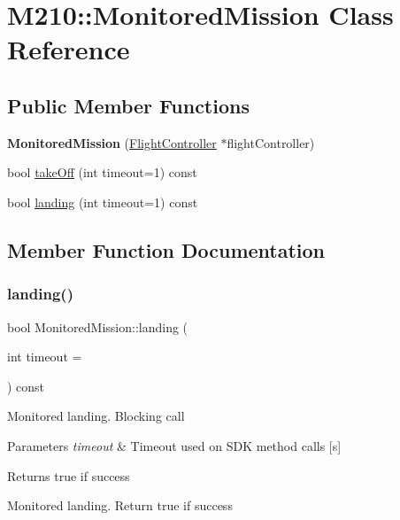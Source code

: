 \hypertarget{class_m210_1_1_monitored_mission}{}\section{M210\+:\+:Monitored\+Mission Class Reference}
\label{class_m210_1_1_monitored_mission}
\subsection*{Public Member Functions}
\begin{DoxyCompactItemize}
\item 
\mbox{\label{class_m210_1_1_monitored_mission_a7f47ae2a0d72c6f28b33c81950b6c215}} 
{\bfseries Monitored\+Mission} (\mbox{\hyperlink{class_m210_1_1_flight_controller}{Flight\+Controller}} $\ast$flight\+Controller)
\item 
bool \mbox{\hyperlink{class_m210_1_1_monitored_mission_a70392abfa221992cf46ffddae110ee5a}{take\+Off}} (int timeout=1) const
\item 
bool \mbox{\hyperlink{class_m210_1_1_monitored_mission_aa9c133ca528a6942514a5be8395b4984}{landing}} (int timeout=1) const
\end{DoxyCompactItemize}


\subsection{Member Function Documentation}
\mbox{\label{class_m210_1_1_monitored_mission_aa9c133ca528a6942514a5be8395b4984}} 
\subsubsection{\texorpdfstring{landing()}{landing()}}
{\footnotesize\ttfamily bool Monitored\+Mission\+::landing (\begin{DoxyParamCaption}\item[{int}]{timeout = {} }\end{DoxyParamCaption}) const}

Monitored landing. Blocking call 
\begin{DoxyParams}{Parameters}
{\em timeout} & Timeout used on S\+DK method calls \mbox{[}s\mbox{]} \\
\hline
\end{DoxyParams}
\begin{DoxyReturn}{Returns}
true if success
\end{DoxyReturn}
Monitored landing. Return true if success \mbox{\label{class_m210_1_1_monitored_mission_a70392abfa221992cf46ffddae110ee5a}} 
